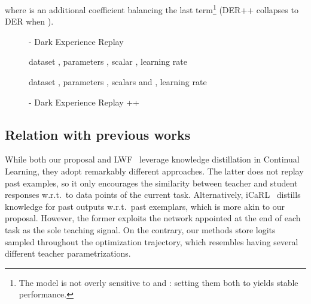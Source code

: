 \documentclass{article}
\begin{document}
where  is an additional coefficient balancing the last term\footnote{The model is not overly sensitive to  and : setting them both to  yields stable performance.} (DER++ collapses to DER when ).
\begin{figure}
\centering
\begin{minipage}[t]{0.485\textwidth}
\begin{algorithm}[H]
\small
\caption{- Dark Experience Replay}
\label{alg:der}
\begin{algorithmic}
   dataset , parameters , scalar ,
  \STATE \hspace{3.1em}learning rate 
  \vspace{0.55em}
  \STATE 
          \STATE 
          \STATE 
          \STATE 
          \STATE 
          \STATE 
          \STATE 
          \STATE 
      \ENDFOR
    \vspace{0.55em}
\end{algorithmic}
\end{algorithm}
\end{minipage}
\hfill
\begin{minipage}[t]{0.485\textwidth}
\begin{algorithm}[H]
\small
\caption{- Dark Experience Replay ++}
\label{alg:derpp}
\begin{algorithmic}
   dataset , parameters , scalars  and ,
  \STATE \hspace{3.1em}learning rate 
  \STATE 
          \STATE 
          \STATE 
          \STATE 
          \STATE 
          \STATE 
          \STATE 
          \STATE 
          \STATE 
      \ENDFOR
\end{algorithmic}
\end{algorithm}
\end{minipage}
\end{figure}

\subsection{Relation with previous works}
While both our proposal and LWF~\cite{li2017learning} leverage knowledge distillation in Continual Learning, they adopt remarkably different approaches. The latter does not replay past examples, so it only encourages the similarity between teacher and student responses w.r.t.\ to data points of the current task. Alternatively, iCaRL~\cite{rebuffi2017icarl} distills knowledge for past outputs w.r.t.\ past exemplars, which is more akin to our proposal.
However, the former exploits the network appointed at the end of each task as the sole teaching signal. On the contrary, our methods store logits sampled throughout the optimization trajectory, which resembles having several different teacher parametrizations.
\end{document}
